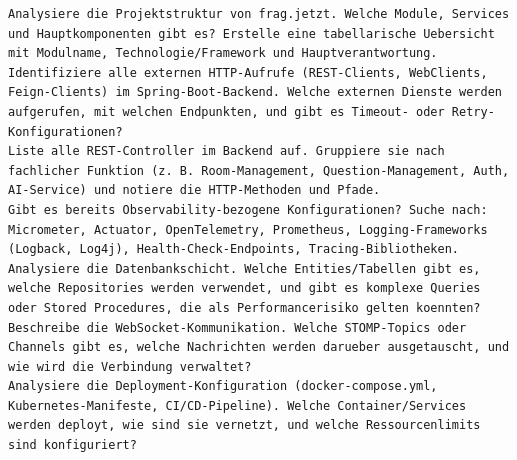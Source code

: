 \begin{lstlisting}[caption={Copilot-Prompts zur Architekturanalyse}]
Analysiere die Projektstruktur von frag.jetzt. Welche Module, Services und Hauptkomponenten gibt es? Erstelle eine tabellarische Uebersicht mit Modulname, Technologie/Framework und Hauptverantwortung.
Identifiziere alle externen HTTP-Aufrufe (REST-Clients, WebClients, Feign-Clients) im Spring-Boot-Backend. Welche externen Dienste werden aufgerufen, mit welchen Endpunkten, und gibt es Timeout- oder Retry-Konfigurationen?
Liste alle REST-Controller im Backend auf. Gruppiere sie nach fachlicher Funktion (z. B. Room-Management, Question-Management, Auth, AI-Service) und notiere die HTTP-Methoden und Pfade.
Gibt es bereits Observability-bezogene Konfigurationen? Suche nach: Micrometer, Actuator, OpenTelemetry, Prometheus, Logging-Frameworks (Logback, Log4j), Health-Check-Endpoints, Tracing-Bibliotheken.
Analysiere die Datenbankschicht. Welche Entities/Tabellen gibt es, welche Repositories werden verwendet, und gibt es komplexe Queries oder Stored Procedures, die als Performancerisiko gelten koennten?
Beschreibe die WebSocket-Kommunikation. Welche STOMP-Topics oder Channels gibt es, welche Nachrichten werden darueber ausgetauscht, und wie wird die Verbindung verwaltet?
Analysiere die Deployment-Konfiguration (docker-compose.yml, Kubernetes-Manifeste, CI/CD-Pipeline). Welche Container/Services werden deployt, wie sind sie vernetzt, und welche Ressourcenlimits sind konfiguriert?
\end{lstlisting}
